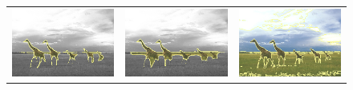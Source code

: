 \documentclass[smallextended]{svjour3}       %
\begin{document}
{{\begin{figure}[hp!]
\begin{tabular}{ccc}
		\includegraphics[scale=0.2]{images/segmentation/bc/giraffes/gc-seg.png} &
		\includegraphics[scale=0.2]{images/segmentation/bc/giraffes/corrected-seg.png} &					\includegraphics[scale=0.2]{images/segmentation/schoenemann/giraffes/giraffes-seg.png}\\

\end{tabular}
\end{figure}}}
\end{document}
